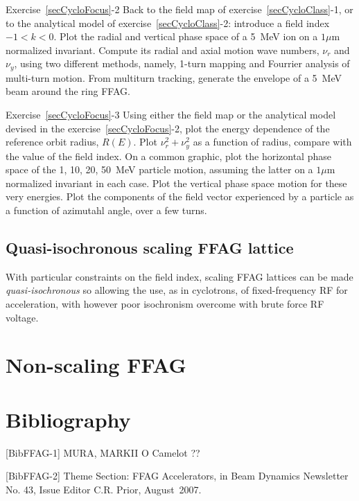 \smallskip
\noindent {\small $\bullet$} Exercise~\ref{secCycloFocus}-2
Back to the field map of exercise~\ref{secCycloClass}-1, or to the analytical model 
of exercise~\ref{secCycloClass}-2: introduce a field index $-1<k<0$. 
Plot the radial and vertical phase space of a 5~MeV ion on a $1\mu$m normalized invariant.  
Compute its radial and axial motion wave numbers, $\nu_r$ and $\nu_y$, 
using two different methods, namely, 1-turn mapping and  Fourrier analysis of multi-turn motion. 
From multiturn tracking, generate the envelope of a 5~MeV beam around the ring FFAG.  


\smallskip
\noindent {\small $\bullet$} Exercise~\ref{secCycloFocus}-3
Using either the field map or the analytical model devised in the  exercise~\ref{secCycloFocus}-2, 
 plot the energy dependence of the reference orbit radius, $R(E)$. 
Plot  $\nu_r^2 + \nu_y^2$ as a function of radius, compare with the value of the field index. 
On a common graphic, plot the horizontal phase space of the 1, 10, 20, 50~MeV particle motion,
assuming the latter on a $1\mu$m normalized invariant in each case.
Plot the vertical phase space motion for these very energies. 
Plot the components of the field vector experienced by a particle as a function of 
azimutahl angle, over a few turns.


\subsection{Quasi-isochronous scaling FFAG lattice \label{SecFFAGQuasiIsoCrhro}}

With particular constraints on the field index, 
scaling FFAG lattices can be made \textsl{quasi-isochronous} so allowing the use, as in cyclotrons, of fixed-frequency RF 
for acceleration, with however poor isochronism overcome with brute force RF voltage. 




\section{Non-scaling FFAG \label{secFFAGNS}}



\section{Bibliography}

[BibFFAG-1] MURA, MARKII
O Camelot ??


[BibFFAG-2]
Theme Section: FFAG Accelerators, 
in 
Beam Dynamics Newsletter No. 43, 
Issue Editor C.R. Prior, 
August~2007.




